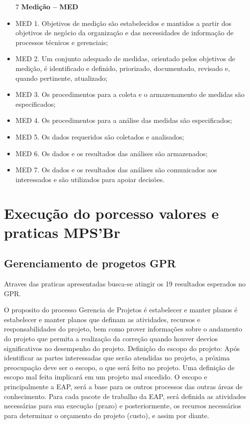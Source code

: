 \documentclass[	DIV=calc,%
							paper=a4,%
							fontsize=12pt,%
							onecolumn]{scrartcl}	 					%
\begin{document}
\begin{itemize}
\item[7] {\textbf{Medição – MED}}
\item MED 1. Objetivos de medição são estabelecidos e mantidos a partir dos objetivos de negócio da organização e das necessidades de informação de processos técnicos e gerenciais; 
\item MED 2. Um conjunto adequado de medidas, orientado pelos objetivos de medição, é identificado e definido, priorizado, documentado, revisado e, quando pertinente, atualizado; 
\item MED 3. Os procedimentos para a coleta e o armazenamento de medidas são especificados; 
\item MED 4. Os procedimentos para a análise das medidas são especificados; 
\item MED 5. Os dados requeridos são coletados e analisados; 
\item MED 6. Os dados e os resultados das análises são armazenados; 
\item MED 7. Os dados e os resultados das análises são comunicados aos interessados e são utilizados para apoiar decisões.
\end{itemize}

\section{Execução do porcesso valores e praticas MPS'Br}
\subsection{Gerenciamento de progetos GPR}

Atraves das praticas apresentadas busca-se atingir os 19 resultados esperados no GPR.

O proposito do processo Gerencia de Projetos é estabelecer e manter planos é estabelecer e manter planos que definam as atividades, recursos e responsabilidades do projeto, bem como prover informações sobre o andamento do projeto que permita a realização da correção quando houver desvios significativos no desempenho do projeto.
Definição do escopo do projeto: Após identificar as partes interessadas que serão atendidas no projeto, a próxima preocupação deve ser o escopo, o que será feito no projeto. Uma definição de escopo mal feita implicará em um projeto mal sucedido. O escopo e principalmente a EAP, será a base para os outros processos das outras áreas de conhecimento. Para cada pacote de trabalho da EAP, será definida as atividades necessárias para sua execução (prazo) e posteriormente, os recursos necessários para determinar o orçamento do projeto (custo), e assim por diante.
\end{document}
